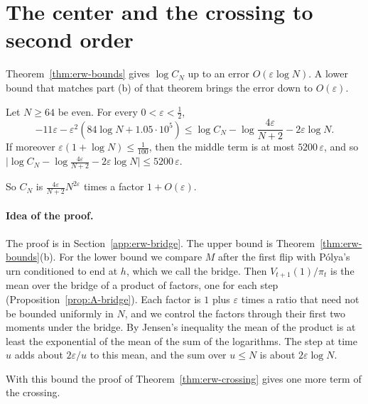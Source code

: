 
\section{The center and the crossing to second order}\label{sec:erw-second}

Theorem~\ref{thm:erw-bounds} gives $\log C_N$ up to an error
$O(\varepsilon\log N)$. A lower bound that matches part (b) of that theorem
brings the error down to $O(\varepsilon)$.

\begin{proposition}\label{prop:second-order}
Let $N\ge64$ be even. For every $0<\varepsilon<\frac12$,
\[
 -11\varepsilon-\varepsilon^2(84\log N+1.05\cdot10^5)
 \le\log C_N-\log\frac{4\varepsilon}{N+2}-2\varepsilon\log N .
\]
If moreover $\varepsilon(1+\log N)\le\frac1{100}$, then the middle term is at most
$5200\,\varepsilon$, and so
$\bigl\lvert\log C_N-\log\frac{4\varepsilon}{N+2}-2\varepsilon\log N\bigr\rvert
\le5200\,\varepsilon$.
\end{proposition}

So $C_N$ is $\frac{4\varepsilon}{N+2}N^{2\varepsilon}$ times a factor
$1+O(\varepsilon)$.

\paragraph{Idea of the proof.}
The proof is in Section~\ref{app:erw-bridge}. The upper bound is
Theorem~\ref{thm:erw-bounds}(b). For the lower bound we compare $M$ after
the first flip with P\'olya's urn conditioned to end at $h$, which we call
the bridge. Then $V_{t+1}(1)/\pi_t$ is the mean over the bridge of a product
of factors, one for each step (Proposition~\ref{prop:A-bridge}). Each factor
is $1$ plus $\varepsilon$ times a ratio that need not be bounded uniformly in
$N$, and we control the factors through their first two moments under the
bridge. By Jensen's inequality the mean of the
product is at least the exponential of the mean of the sum of the
logarithms. The step at time $u$ adds about $2\varepsilon/u$ to this mean,
and the sum over $u\le N$ is about $2\varepsilon\log N$.

With this bound the proof of Theorem~\ref{thm:erw-crossing} gives one more
term of the crossing.

